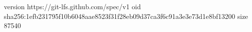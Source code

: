 version https://git-lfs.github.com/spec/v1
oid sha256:1efb231795f10b6048aae8523f31f28eb09d37ca3f6c91a3e3e73d1e8bf13200
size 87540
